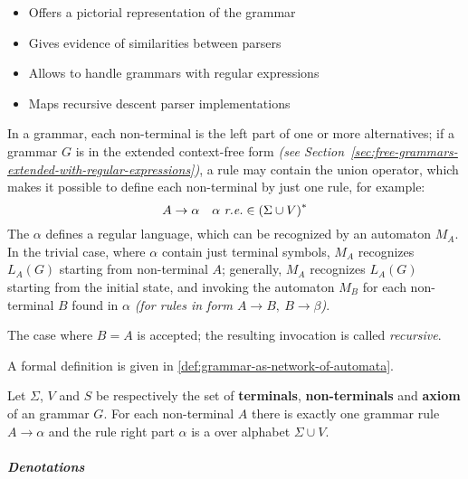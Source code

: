 \documentclass[english]{article}
\begin{document}
\begin{itemize}
  \item Offers a pictorial representation of the grammar
  \item Gives evidence of similarities between parsers
  \item Allows to handle grammars with regular expressions
  \item Maps recursive descent parser implementations
\end{itemize}

\bigskip
In a grammar, each non-terminal is the left part of one or more alternatives;
if a grammar \(G\) is in the extended context-free form \textit{(see Section~\ref{sec:free-grammars-extended-with-regular-expressions})}, a rule \RP may contain the union operator, which makes it possible to define each non-terminal by just one rule, for example:
\[ A \rightarrow \alpha \quad \alpha \ \textit{r.e.} \in \left( \Sigma \cup V \right)^\ast \]
The \re \(\alpha\) defines a regular language, which can be recognized by an automaton \(M_A\).
In the trivial case, where \(\alpha\) contain just terminal symbols, \(M_A\) recognizes \(L_A(G)\) starting from non-terminal \(A\);
generally, \(M_A\) recognizes \(L_A(G)\) starting from the initial state, and invoking the automaton \(M_{B}\) for each non-terminal \(B\) found in \(\alpha\) \textit{(for rules in form \(A \rightarrow B,\  B \rightarrow \beta\))}.

The case where \(B = A\) is accepted; the resulting invocation is called \textit{recursive}.

\bigskip
A formal definition is given in \ref{def:grammar-as-network-of-automata}.

\begin{definition}
  \label{def:grammar-as-network-of-automata}
  Let \(\Sigma\), \(V\) and \(S\) be respectively the set of \textbf{terminals}, \textbf{non-terminals} and \textbf{axiom} of an \EBNF grammar \(G\).
  For each non-terminal \(A\) there is exactly one grammar rule \(A \rightarrow \alpha\) and the rule right part \(\alpha\) is a \re over alphabet \(\Sigma \cup V\).
\end{definition}

\subparagraph*{Denotations}
\end{document}
